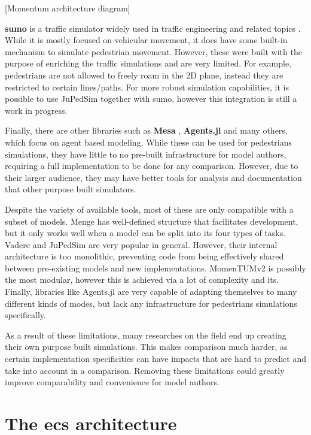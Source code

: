 \documentclass[twoside, 11pt]{article}
\begin{document}
[Momentum architecture diagram]

\textbf{\gls{sumo}} is a traffic simulator widely used in traffic engineering and related topics \cite{SUMO2018}. While it is mostly focused on vehicular movement, it does have some built-in mechanism to simulate pedestrian movement. However, these were built with the purpose of enriching the traffic simulations and are very limited. For example, pedestrians are not allowed to freely roam in the 2D plane, instead they are restricted to certain lines/paths. For more robust simulation capabilities, it is possible to use JuPedSim together with \gls{sumo}, however this integration is still a work in progress.


Finally, there are other libraries such as \textbf{Mesa} \cite{hoevenMesa3Agentbased2025}, \textbf{Agents.jl} \cite{Agents.jl} and many others, which focus on agent based modeling. While these can be used for pedestrians simulations, they have little to no pre-built infrastructure for model authors, requiring a full implementation to be done for any comparison. However, due to their larger audience, they may have better tools for analysis and documentation that other purpose built simulators.

Despite the variety of available tools, most of these are only compatible with a subset of models. Menge has well-defined structure that facilitates development, but it only works well when a model can be split into its four types of tasks. Vadere and JuPedSim are very popular in general. However, their internal architecture is too monolithic, preventing code from being effectively shared between pre-existing models and new implementations. MomenTUMv2 is possibly the most modular, however this is achieved via a lot of complexity and its. Finally, libraries like Agents.jl are very capable of adapting themselves to many different kinds of modes, but lack any infrastructure for pedestrians  simulations specifically.

As a result of these limitations, many researches on the field end up creating their own purpose built simulations. This makes comparison much harder, as certain implementation specificities can have impacts that are hard to predict and take into account in a comparison. Removing these limitations could greatly improve comparability and convenience for model authors.

\section{The \acrlong{ecs} architecture}
\end{document}
